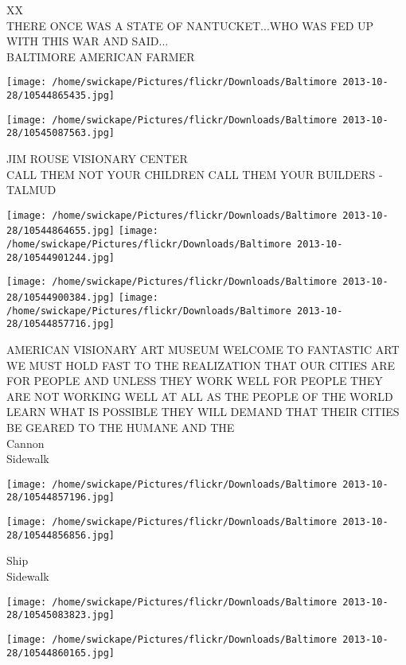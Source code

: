 \documentclass[10pt,letterpaper]{article}
\begin{document}
XX\\
THERE ONCE WAS A STATE OF NANTUCKET...WHO WAS FED UP WITH THIS WAR AND SAID...\\
BALTIMORE AMERICAN FARMER
\pagebreak

\texttt{[image: /home/swickape/Pictures/flickr/Downloads/Baltimore 2013-10-28/10544865435.jpg]}

\vspace{0.25in}
\texttt{[image: /home/swickape/Pictures/flickr/Downloads/Baltimore 2013-10-28/10545087563.jpg]}

JIM ROUSE VISIONARY CENTER\\
CALL THEM NOT YOUR CHILDREN CALL THEM YOUR BUILDERS {-} TALMUD
\pagebreak

\texttt{[image: /home/swickape/Pictures/flickr/Downloads/Baltimore 2013-10-28/10544864655.jpg]}
\texttt{[image: /home/swickape/Pictures/flickr/Downloads/Baltimore 2013-10-28/10544901244.jpg]}

\texttt{[image: /home/swickape/Pictures/flickr/Downloads/Baltimore 2013-10-28/10544900384.jpg]}
\texttt{[image: /home/swickape/Pictures/flickr/Downloads/Baltimore 2013-10-28/10544857716.jpg]}

AMERICAN VISIONARY ART MUSEUM WELCOME TO FANTASTIC ART\\
WE MUST HOLD FAST TO THE REALIZATION THAT OUR CITIES ARE FOR PEOPLE AND UNLESS THEY WORK WELL FOR PEOPLE THEY ARE NOT WORKING WELL AT ALL AS THE PEOPLE OF THE WORLD LEARN WHAT IS POSSIBLE THEY WILL DEMAND THAT THEIR CITIES BE GEARED TO THE HUMANE AND THE\\
Cannon\\
Sidewalk
\pagebreak

\texttt{[image: /home/swickape/Pictures/flickr/Downloads/Baltimore 2013-10-28/10544857196.jpg]}

\vspace{0.25in}
\texttt{[image: /home/swickape/Pictures/flickr/Downloads/Baltimore 2013-10-28/10544856856.jpg]}

Ship\\
Sidewalk
\pagebreak

\texttt{[image: /home/swickape/Pictures/flickr/Downloads/Baltimore 2013-10-28/10545083823.jpg]}

\vspace{0.25in}
\texttt{[image: /home/swickape/Pictures/flickr/Downloads/Baltimore 2013-10-28/10544860165.jpg]}
\end{document}
